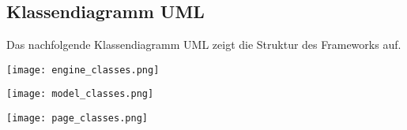 \subsection{Klassendiagramm UML}
Das nachfolgende Klassendiagramm UML zeigt die Struktur des Frameworks auf.

\vspace{2mm}
\mbox{}
\begin{center}
    \texttt{[image: engine\_classes.png]}
\end{center}

\mbox{}
\begin{center}
    \texttt{[image: model\_classes.png]}
\end{center}

\mbox{}
\begin{center}
    \texttt{[image: page\_classes.png]}
\end{center}
\vspace{2mm}
